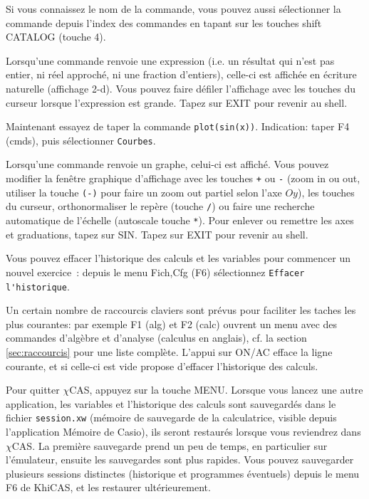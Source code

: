 \documentclass{article}
\begin{document}
\begin{giacjshere}
Si vous connaissez le nom de la commande, vous pouvez aussi
sélectionner la commande depuis l'index des commandes
en tapant sur les touches shift CATALOG (touche 4).

Lorsqu'une commande renvoie une expression (i.e. un r\'esultat qui
n'est pas entier, ni r\'eel approch\'e, ni une fraction d'entiers), 
celle-ci est affich\'ee
en \'ecriture naturelle (affichage 2-d). Vous pouvez faire d\'efiler 
l'affichage avec les touches du curseur lorsque l'expression est grande.
Tapez sur EXIT pour revenir au shell.

Maintenant essayez de taper la commande \verb|plot(sin(x))|.
Indication: taper F4 (cmds), puis s\'electionner 
\verb|Courbes|.

Lorsqu'une commande renvoie un graphe, celui-ci est affich\'e. Vous
pouvez modifier la fen\^etre graphique d'affichage 
avec les touches \verb|+| ou \verb|-| 
(zoom in ou out, utiliser la touche \verb|(-)|
pour faire un zoom out partiel selon l'axe $Oy$),
les touches du curseur, orthonormaliser le rep\`ere (touche \verb|/|)
ou faire une recherche automatique de l'\'echelle (autoscale 
touche \verb|*|). Pour enlever ou remettre les axes et graduations,
tapez sur SIN.
Tapez sur EXIT pour revenir au shell.

Vous pouvez effacer l'historique des calculs et les variables
pour commencer un nouvel exercice~: depuis le menu Fich,Cfg (F6) 
s\'electionnez \verb|Effacer l'historique|. 

Un certain nombre de raccourcis claviers sont pr\'evus pour faciliter 
les taches les plus courantes: par exemple F1 (alg) et F2 (calc) ouvrent un menu
avec des commandes d'alg\`ebre et d'analyse (calculus en anglais),
cf. la section \ref{sec:raccourcis} pour une liste compl\`ete. 
L'appui sur ON/AC efface la ligne courante, et si celle-ci
est vide propose d'effacer l'historique des calculs.

Pour quitter $\chi$CAS, appuyez sur la touche MENU. Lorsque vous lancez
une autre application, les variables et l'historique des calculs
sont sauvegard\'es dans le fichier {\tt session.xw}
(mémoire de sauvegarde de la calculatrice, visible
depuis l'application Mémoire de Casio), 
ils seront restaur\'es lorsque vous reviendrez
dans $\chi$CAS. 
La premi\`ere sauvegarde prend un peu de temps, en particulier 
sur l'\'emulateur,
ensuite les sauvegardes sont plus rapides. 
Vous pouvez sauvegarder plusieurs sessions distinctes (historique et
programmes \'eventuels) depuis le menu F6 de KhiCAS, et les
restaurer ult\'erieurement.


\end{giacjshere}
\end{document}
